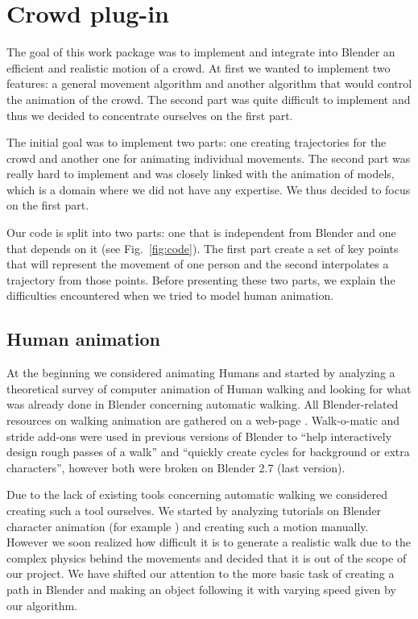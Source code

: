 \section{Crowd plug-in}

The goal of this work package was to implement and integrate into
Blender an efficient and realistic motion of a crowd. At first we
wanted to implement two features: a general movement algorithm and another
algorithm that would control the animation of the crowd. The second
part was quite difficult to implement and thus we decided to
concentrate ourselves on the first part.


The initial goal was to implement two parts: one creating trajectories
for the crowd and another one for animating individual movements. The
second part was really hard to implement and was closely linked with
the animation of models, which is a domain where we did not have any
expertise. We thus decided to focus on the first part.


Our code is split into two parts: one that is independent from Blender
and one that depends on it (see Fig.~\ref{fig:code}). The first part
create a set of key points that will represent the movement of one
person and the second interpolates a trajectory from those
points. Before presenting these two parts, we explain the difficulties
encountered when we tried to model human animation.


\subsection{Human animation}

At the beginning we considered animating Humans and started by
analyzing a theoretical survey of computer animation of Human walking
\cite{th_walking} and looking for what was already done in Blender
concerning automatic walking. All Blender-related resources on walking
animation are gathered on a web-page
\cite{blwikiwalking}. Walk-o-matic and stride add-ons were used in
previous versions of Blender to ``help interactively design rough
passes of a walk'' and ``quickly create cycles for background or extra
characters'', however both were broken on Blender 2.7 (last version).

Due to the lack of existing tools concerning automatic walking we
considered creating such a tool ourselves. We started by analyzing
tutorials on Blender character animation (for example
\cite{tuto_walk}) and creating such a motion manually. However we soon
realized how difficult it is to generate a realistic walk due to the
complex physics behind the movements and decided that it is out of the
scope of our project. We have shifted our attention to the more basic
task of creating a path in Blender and making an object following it
with varying speed given by our algorithm.


